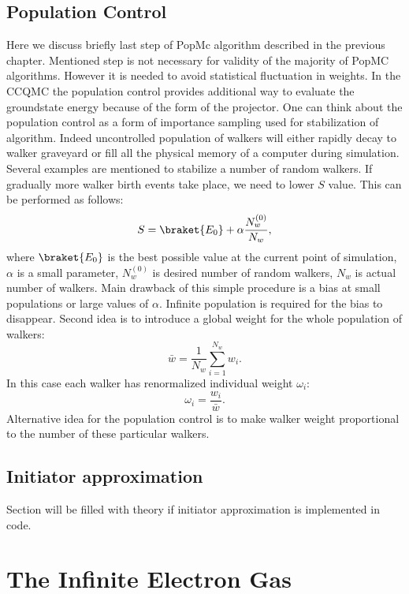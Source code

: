\documentclass[twoside,english]{uiofysmaster}
\begin{document}
\section{Population Control}
Here we discuss briefly last step of PopMc algorithm described in the previous chapter. Mentioned step is not necessary for validity of the majority of PopMC algorithms. However it is needed to avoid statistical fluctuation in weights. In the CCQMC the population control provides additional way to evaluate the groundstate energy because of the form of the projector. One can think about the population control as a form of importance sampling used for stabilization of algorithm. Indeed uncontrolled population of walkers will either rapidly decay to walker graveyard or fill all the physical memory of a computer during simulation. Several examples are mentioned to stabilize a number of random walkers. If gradually more walker birth events take place, we need to lower $S$ value. This can be performed as follows:
\begin{equation}
S = \braket{E_0} + \alpha \frac{N_w^{(0)}}{N_w},
\end{equation}  
where $\braket{E_0}$ is the best possible value at the current point of simulation, $\alpha$ is a small parameter, $N_w^{(0)}$ is desired number of random walkers, $N_w$ is actual number of walkers. Main drawback of this simple procedure is a bias at small populations or large values of $\alpha$. Infinite population is required for the bias to disappear.
Second idea is to introduce a global weight for the whole population of walkers:
\begin{equation}
\bar{w} = \frac{1}{N_w}\sum_{i=1}^{N_w}w_i.
\end{equation}  
In this case each walker has renormalized individual weight $\omega_i$:
\begin{equation}
\omega_i = \frac{w_i}{\bar{w}}.
\end{equation}  
Alternative idea for the population control is to make walker weight proportional to the number of these particular walkers.

\section{Initiator approximation}

Section will be filled with theory if initiator approximation is implemented in code.

\chapter{The Infinite Electron Gas}
\end{document}

